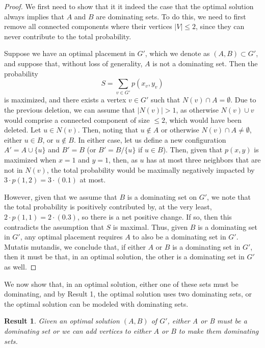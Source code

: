 \documentclass{article}
\newtheorem{result}{Result}
\begin{document}
\begin{proof}
We first need to show that it it indeed the case that the optimal solution always implies that $A$ and $B$ are dominating sets. To do this, we need to first remove all connected components where their vertices \(|V|\leq 2\), since they can never contribute to the total probability.

Suppose we have an optimal placement in $G'$, which we denote as $(A, B) \subset G'$, and suppose that, without loss of generality, $A$ is not a dominating set. Then the probability 
\[S = \sum_{v\in G'} p(x_{v}, y_{v})\]
is maximized, and there exists a vertex $v \in G'$ such that $N(v) \cap A = \emptyset$. Due to the previous deletion, we can assume that $|N(v)| > 1$, as otherwise $N(v) \cup v$ would comprise a connected component of size $\leq 2$, which would have been deleted. Let $u \in N(v)$. Then, noting that $u \notin A$ or otherwise $N(v) \cap A \neq \emptyset$, either $u \in B$, or $u \notin B$. In either case, let us define a new configuration $A' = A \cup \{u\}$ and $B' = B$ (or $B' = B/
\{u\}$ if $u \in B$). Then, given that $p(x,y)$ is maximized when $x=1$ and $y=1$, then, as $u$ has at most three neighbors that are not in $N(v)$, the total probability would be maximally negatively impacted by $3 \cdot p(1,2) = 3 \cdot (0.1)$ at most. 

However, given that we assume that $B$ is a dominating set on $G'$, we note that the total probability is positively contributed by, at the very least, $2 \cdot p(1,1) = 2 \cdot (0.3)$, so there is a net positive change. If so, then this contradicts the assumption that $S$ is maximal. Thus, given $B$ is a dominating set in $G'$, any optimal placement requires $A$ to also be a dominating set in $G'$. Mutatis mutandis, we conclude that, if either $A$ or $B$ is a dominating set in $G'$, then it must be that, in an optimal solution, the other is a dominating set in $G'$ as well. 
\end{proof}

We now show that, in an optimal solution, either one of these sets must be dominating, and by Result 1, the optimal solution uses two dominating sets, or the optimal solution can be modeled with dominating sets. 

\begin{result}
    Given an optimal solution $(A,B)$ of $G'$, either A or B must be a dominating set or we can add vertices to either $A$ or $B$ to make them dominating sets.
\end{result}
\end{document}

